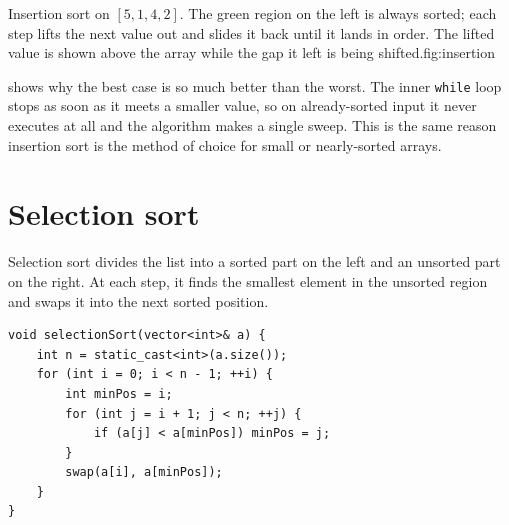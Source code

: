 \begin{utpfig}{Insertion sort on $[5,1,4,2]$. The green region on the left is always sorted;
each step lifts the next value out and slides it back until it lands in order. The lifted
value is shown above the array while the gap it left is being shifted.}{fig:insertion}
\end{utpfig}

 shows why the best case is so much better than the worst. The inner \texttt{while} loop stops as soon as it meets a smaller value, so on already-sorted input it never executes at all and the algorithm makes a single sweep. This is the same reason insertion sort is the method of choice for small or nearly-sorted arrays.

\section{Selection sort}

Selection sort divides the list into a sorted part on the left and an unsorted part on the right. At each step, it finds the smallest element in the unsorted region and swaps it into the next sorted position.

\begin{lstlisting}
void selectionSort(vector<int>& a) {
    int n = static_cast<int>(a.size());
    for (int i = 0; i < n - 1; ++i) {
        int minPos = i;
        for (int j = i + 1; j < n; ++j) {
            if (a[j] < a[minPos]) minPos = j;
        }
        swap(a[i], a[minPos]);
    }
}
\end{lstlisting}

